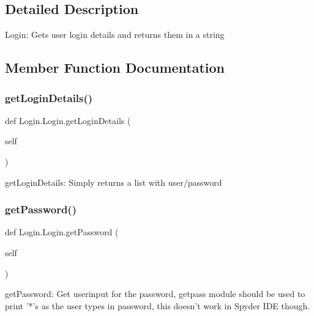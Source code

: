 \subsection{Detailed Description}
\begin{DoxyVerb}Login: Gets user login details and returns them in a string \end{DoxyVerb}
 

\subsection{Member Function Documentation}
\hypertarget{class_login_1_1_login_a4ccae6933e82c3ff7d7cb257427064e2}{}\label{class_login_1_1_login_a4ccae6933e82c3ff7d7cb257427064e2} 
\subsubsection{\texorpdfstring{get\+Login\+Details()}{getLoginDetails()}}
{\footnotesize\ttfamily def Login.\+Login.\+get\+Login\+Details (\begin{DoxyParamCaption}\item[{}]{self }\end{DoxyParamCaption})}

\begin{DoxyVerb}getLoginDetails: Simply returns a list with user/password  \end{DoxyVerb}
 \hypertarget{class_login_1_1_login_a61681c3cd7aae627d5a41324ba0f9d76}{}\label{class_login_1_1_login_a61681c3cd7aae627d5a41324ba0f9d76} 
\subsubsection{\texorpdfstring{get\+Password()}{getPassword()}}
{\footnotesize\ttfamily def Login.\+Login.\+get\+Password (\begin{DoxyParamCaption}\item[{}]{self }\end{DoxyParamCaption})}

\begin{DoxyVerb}getPassword: Get userinput for the password, getpass module 
    should be used to print '*'s as the user types in password,
    this doesn't work in Spyder IDE though. \end{DoxyVerb}
 \hypertarget{class_login_1_1_login_a21cb771ec1b1d2d7aa17ca541465200b}{}\label{class_login_1_1_login_a21cb771ec1b1d2d7aa17ca541465200b} 
